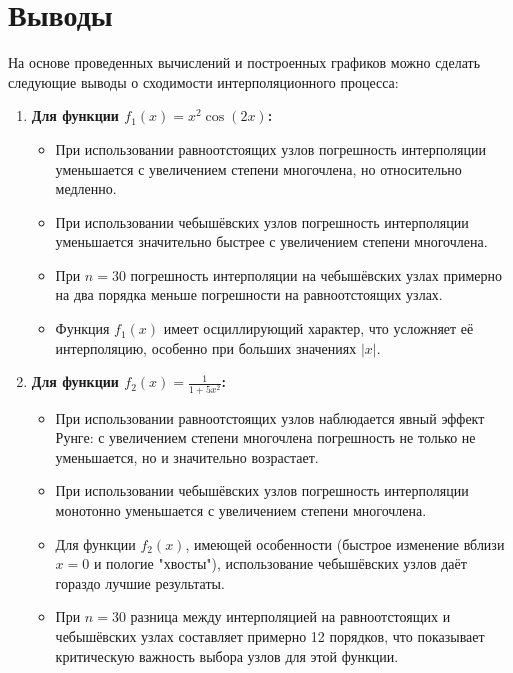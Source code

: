 \documentclass[12pt]{article}
\begin{document}
\section{Выводы}

На основе проведенных вычислений и построенных графиков можно сделать следующие выводы о сходимости интерполяционного процесса:

\begin{enumerate}
    \item \textbf{Для функции $f_1(x) = x^2\cos(2x)$:}
    \begin{itemize}
        \item При использовании равноотстоящих узлов погрешность интерполяции уменьшается с увеличением степени многочлена, но относительно медленно.
        \item При использовании чебышёвских узлов погрешность интерполяции уменьшается значительно быстрее с увеличением степени многочлена.
        \item При $n = 30$ погрешность интерполяции на чебышёвских узлах примерно на два порядка меньше погрешности на равноотстоящих узлах.
        \item Функция $f_1(x)$ имеет осциллирующий характер, что усложняет её интерполяцию, особенно при больших значениях $|x|$.
    \end{itemize}
    
    \item \textbf{Для функции $f_2(x) = \frac{1}{1 + 5x^2}$:}
    \begin{itemize}
        \item При использовании равноотстоящих узлов наблюдается явный эффект Рунге: с увеличением степени многочлена погрешность не только не уменьшается, но и значительно возрастает.
        \item При использовании чебышёвских узлов погрешность интерполяции монотонно уменьшается с увеличением степени многочлена.
        \item Для функции $f_2(x)$, имеющей особенности (быстрое изменение вблизи $x = 0$ и пологие "хвосты"), использование чебышёвских узлов даёт гораздо лучшие результаты.
        \item При $n = 30$ разница между интерполяцией на равноотстоящих и чебышёвских узлах составляет примерно 12 порядков, что показывает критическую важность выбора узлов для этой функции.
    \end{itemize}
\end{enumerate}
\end{document}
